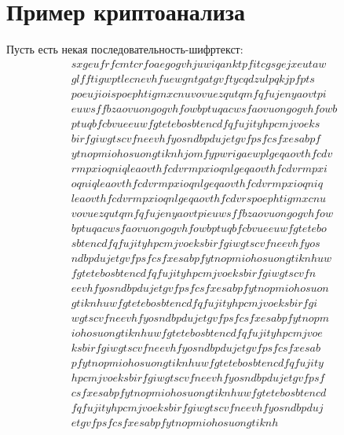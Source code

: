 \documentclass[a4paper]{article}
\begin{document}
  \newpage
  \section{Пример криптоанализа}

  Пусть есть некая последовательность-шифртекст:
  \begin{equation*}
    \begin{aligned}
      sxgeufrfcmtcrfoaegogvhjuwiqanktpfitcgsgejxeutaw\\
      glfftigwptlecnevhfuewgntgatgvftycqdzulpqkjpfpts\\
      poeujioispoephtigmxcnuvovuezqutqmfqfujenyaovtpi\\
      euwsffbzaovuongogvhfowbptuqacwsfaovuongogvhfowb\\
      ptuqbfcbvueeuwfgtetebosbtencdfqfujityhpcmjvoeks\\
      birfgiwgtscvfneevhfyosndbpdujetgvfpsfcsfxesabpf\\
      ytnopmiohosuongtiknhjomfypwrigaewplgeqaovthfcdv\\
      rmpxioqniqleaovthfcdvrmpxioqnlgeqaovthfcdvrmpxi\\
      oqniqleaovthfcdvrmpxioqnlgeqaovthfcdvrmpxioqniq\\
      leaovthfcdvrmpxioqnlgeqaovthfcdvrspoephtigmxcnu\\
      vovuezqutqmfqfujenyaovtpieuwsffbzaovuongogvhfow\\
      bptuqacwsfaovuongogvhfowbptuqbfcbvueeuwfgtetebo\\
      sbtencdfqfujityhpcmjvoeksbirfgiwgtscvfneevhfyos\\
      ndbpdujetgvfpsfcsfxesabpfytnopmiohosuongtiknhuw\\
      fgtetebosbtencdfqfujityhpcmjvoeksbirfgiwgtscvfn\\
      eevhfyosndbpdujetgvfpsfcsfxesabpfytnopmiohosuon\\
      gtiknhuwfgtetebosbtencdfqfujityhpcmjvoeksbirfgi\\
      wgtscvfneevhfyosndbpdujetgvfpsfcsfxesabpfytnopm\\
      iohosuongtiknhuwfgtetebosbtencdfqfujityhpcmjvoe\\
      ksbirfgiwgtscvfneevhfyosndbpdujetgvfpsfcsfxesab\\
      pfytnopmiohosuongtiknhuwfgtetebosbtencdfqfujity\\
      hpcmjvoeksbirfgiwgtscvfneevhfyosndbpdujetgvfpsf\\
      csfxesabpfytnopmiohosuongtiknhuwfgtetebosbtencd\\
      fqfujityhpcmjvoeksbirfgiwgtscvfneevhfyosndbpduj\\
      etgvfpsfcsfxesabpfytnopmiohosuongtiknh
    \end{aligned}
  \end{equation*}
\end{document}
